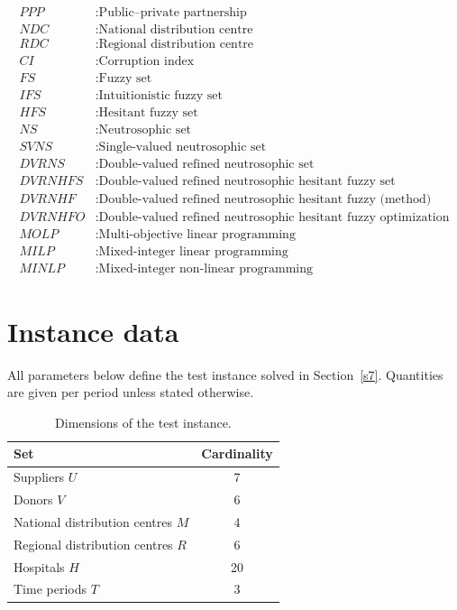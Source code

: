 \documentclass[a4paper]{elsarticle}
\begin{document}
{\begin{align*}
\mathit{PPP}     &: \text{Public--private partnership}\\
\mathit{NDC}     &: \text{National distribution centre}\\
\mathit{RDC}     &: \text{Regional distribution centre}\\
\mathit{CI}      &: \text{Corruption index}\\
\mathit{FS}      &: \text{Fuzzy set}\\
\mathit{IFS}     &: \text{Intuitionistic fuzzy set}\\
\mathit{HFS}     &: \text{Hesitant fuzzy set}\\
\mathit{NS}      &: \text{Neutrosophic set}\\
\mathit{SVNS}    &: \text{Single-valued neutrosophic set}\\
\mathit{DVRNS}   &: \text{Double-valued refined neutrosophic set}\\
\mathit{DVRNHFS} &: \text{Double-valued refined neutrosophic hesitant fuzzy set}\\
\mathit{DVRNHF}  &: \text{Double-valued refined neutrosophic hesitant fuzzy (method)}\\
\mathit{DVRNHFO} &: \text{Double-valued refined neutrosophic hesitant fuzzy optimization}\\
\mathit{MOLP}    &: \text{Multi-objective linear programming}\\
\mathit{MILP}    &: \text{Mixed-integer linear programming}\\
\mathit{MINLP}   &: \text{Mixed-integer non-linear programming}
\end{align*}



%


\appendix
\section{Instance data}
\label{app:data}

\noindent All parameters below define the test instance solved in Section~\ref{s7}.
Quantities are given per period unless stated otherwise.

\begin{table}[htbp]
\centering
\caption{Dimensions of the test instance.}
\label{tab:A1}
\begin{tabular}{lc}
\toprule
Set & Cardinality \\
\midrule
Suppliers $U$ & 7 \\
Donors $V$ & 6 \\
National distribution centres $M$ & 4 \\
Regional distribution centres $R$ & 6 \\
Hospitals $H$ & 20 \\
Time periods $T$ & 3 \\
\bottomrule
\end{tabular}
\end{table}

}
\end{document}
